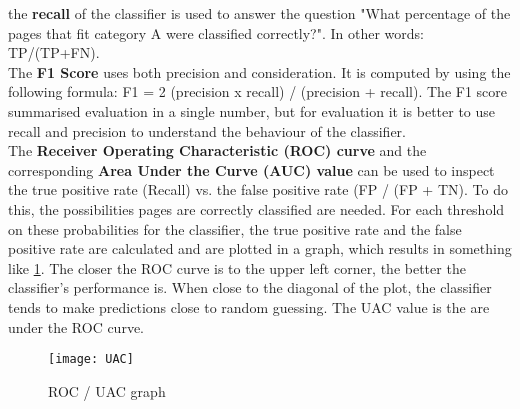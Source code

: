 the \textbf{recall} of the classifier is used to answer the question "What percentage of the pages that fit category A were classified correctly?". In other words: TP/(TP+FN).\\

The \textbf{F1 Score} uses both precision and consideration. It is computed by using the following formula: F1 = 2 (precision x recall) / (precision + recall). The F1 score summarised evaluation in a single number, but for evaluation it is better to use recall and precision to understand the behaviour of the classifier. \\

The \textbf{Receiver Operating Characteristic (ROC) curve} and the corresponding \textbf{Area Under the Curve (AUC) value} can be used to inspect the true positive rate (Recall) vs. the false positive rate (FP / (FP + TN). To do this, the possibilities pages are correctly classified are needed. For each threshold on these probabilities for the classifier, the true positive rate and the false positive rate are calculated and are plotted in a graph, which results in something like \ref{fig:UAC}. The closer the ROC curve is to the upper left corner, the better the classifier's performance is. When close to the diagonal of the plot, the classifier tends to make predictions close to random guessing. The UAC value is the are under the ROC curve.

\begin{figure}[h]
\centering
\texttt{[image: UAC]}
\caption{ROC / UAC graph \protect\footnotemark{}}
\label{fig:UAC}
\end{figure}


